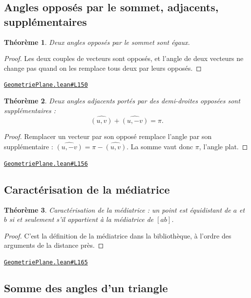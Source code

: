 \documentclass[11pt,a4paper]{article}
\theoremstyle{definition}
\theoremstyle{plain}
\newtheorem{theoreme}{Théorème}
\newcommand{\source}[2]{\par\smallskip\noindent\hfill{\footnotesize\href{#1}{\texttt{#2}}}\par\smallskip}
\begin{document}
\subsection{Angles opposés par le sommet, adjacents, supplémentaires}

\begin{theoreme}
Deux angles opposés par le sommet sont égaux.
\end{theoreme}

\begin{proof}
Les deux couples de vecteurs sont opposés, et l'angle de deux vecteurs ne change pas
quand on les remplace tous deux par leurs opposés.
\end{proof}
\source{https://github.com/Commutator-IO/learn-lean/blob/main/cours/01-college/02-geometrie-plane/GeometriePlane.lean\#L150}{GeometriePlane.lean\#L150}

\begin{theoreme}
Deux angles adjacents portés par des demi-droites opposées sont supplémentaires :
\[ \widehat{(u, v)} + \widehat{(u, -v)} = \pi . \]
\end{theoreme}

\begin{proof}
Remplacer un vecteur par son opposé remplace l'angle par son supplémentaire :
$\widehat{(u, -v)} = \pi - \widehat{(u, v)}$. La somme vaut donc $\pi$, l'angle plat.
\end{proof}
\source{https://github.com/Commutator-IO/learn-lean/blob/main/cours/01-college/02-geometrie-plane/GeometriePlane.lean\#L156}{GeometriePlane.lean\#L156}

\subsection{Caractérisation de la médiatrice}

\begin{theoreme}
Caractérisation de la médiatrice : un point est équidistant de $a$ et $b$ si et
seulement s'il appartient à la médiatrice de $[ab]$.
\end{theoreme}

\begin{proof}
C'est la définition de la médiatrice dans la bibliothèque, à l'ordre des arguments de
la distance près.
\end{proof}
\source{https://github.com/Commutator-IO/learn-lean/blob/main/cours/01-college/02-geometrie-plane/GeometriePlane.lean\#L165}{GeometriePlane.lean\#L165}

\subsection{Somme des angles d'un triangle}
\end{document}
